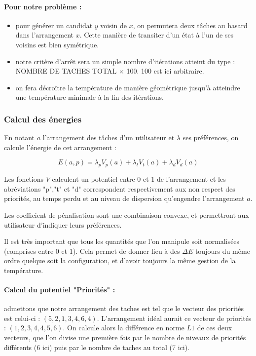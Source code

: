 \documentclass[12pt]{article}
\begin{document}
\paragraph{Pour notre problème :}
\begin{itemize}
\item pour générer un candidat $y$ voisin de $x$, on permutera deux tâches au hasard dans l'arrangement $x$. Cette manière de transiter d'un état à l'un de ses voisins est bien symétrique.
\item notre critère d'arrêt sera un simple nombre d'itérations atteint du type : NOMBRE DE TACHES TOTAL $\times$ 100. 100 est ici arbitraire.
\item on fera décroître la température de manière géométrique jusqu'à atteindre une température minimale à la fin des itérations.
\end{itemize}
\subsubsection{Calcul des énergies}
En notant $a$ l'arrangement des tâches d'un utilisateur et $\lambda$ ses préférences, on calcule l'énergie de cet arrangement :

\[
E (a,p) = \lambda_{p}  V_p(a) + \lambda_{t}  V_{t}(a)  + \lambda_{d} V_{d}(a)
\]

Les fonctions $V$ calculent un potentiel entre 0 et 1 de l'arrangement et les abréviations "p","t" et "d" correspondent respectivement aux non respect des priorités, au temps perdu et au niveau de dispersion qu'engendre l'arrangement $a$.

Les coefficient de pénalisation sont une combinaison convexe, et permettront aux utilisateur d'indiquer leurs préférences.

Il est très important que tous les quantités que l'on manipule soit normalisées (comprises entre 0 et 1). Cela permet de donner lieu à des $\Delta E$ toujours du même ordre quelque soit la configuration, et d'avoir toujours la même gestion de la température.
\paragraph{Calcul du potentiel "Priorités" :} admettons que notre arrangement des taches est tel que le vecteur des priorités est celui-ci : $(5,2,1,3,4,6,4)$. L'arrangement idéal aurait ce vecteur de priorités : $(1,2,3,4,4,5,6)$. On calcule alors la différence en norme $L1$ de ces deux vecteurs, que l'on divise une première fois par le nombre de niveaux de priorités différents (6 ici) puis par le nombre de taches au total (7 ici).
\end{document}
